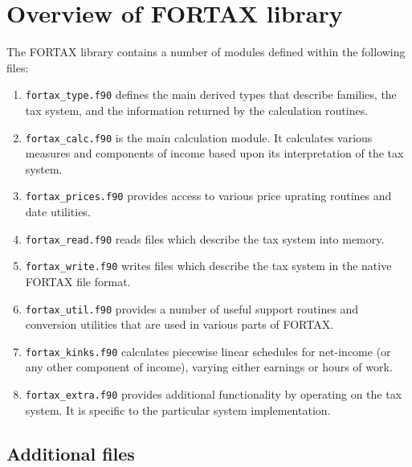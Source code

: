 \documentclass[11pt,thmsa,letter,ukenglish]{article}
\begin{document}
%

\section{Overview of FORTAX library}\label{sec:overview}

The FORTAX library contains a number of modules defined within the following files:
\begin{enumerate}
 \item \texttt{fortax\_type.f90} defines the main derived types that describe families, the tax system, and the information returned by the calculation routines.
 \item \texttt{fortax\_calc.f90} is the main calculation module. It calculates various measures and components of income based upon its interpretation of the tax system.
 \item \texttt{fortax\_prices.f90} provides access to various price uprating routines and date utilities.
 \item \texttt{fortax\_read.f90} reads files which describe the tax system into memory.
 \item \texttt{fortax\_write.f90} writes files which describe the tax system in the native FORTAX file format.
 \item \texttt{fortax\_util.f90} provides a number of useful support routines and conversion utilities that are used in various parts of FORTAX.
 \item \texttt{fortax\_kinks.f90} calculates piecewise linear schedules for net-income (or any other component of income), varying either earnings or hours of work.
 \item \texttt{fortax\_extra.f90} provides additional functionality by operating on the tax system. It is specific to the particular system implementation.
\end{enumerate}

\subsection{Additional files}\label{sec:additionalfiles}
\end{document}
